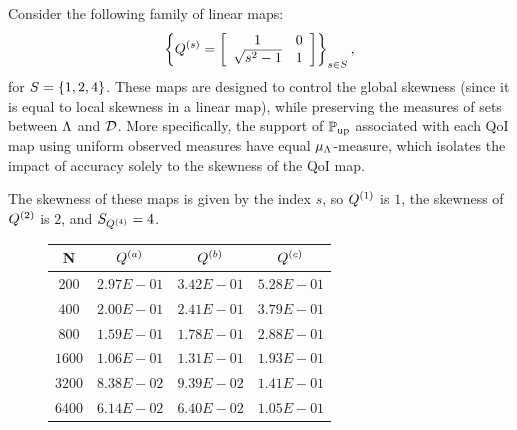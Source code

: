 \begin{ex}
\label{ex:skewness}
Consider the following family of linear maps:
\begin{equation}\label{eq:qmap2}
\left \lbrace \qoi^{(s)} =  \mat{cc}{1 & 0 \\ \sqrt{s^2 - 1}& 1 } \right \rbrace_{s\in S},
\end{equation}
for $S=\set{1,2,4}$. These maps are designed to control the global skewness (since it is equal to local skewness in a linear map), while preserving the measures of sets between $\pspace$ and $\dspace$.
More specifically, the support of $\updatedP$ associated with each QoI map using uniform observed measures have equal $\pmeas$-measure, which isolates the impact of accuracy solely to the skewness of the QoI map.

The skewness of these maps is given by the index $s$, so $\qoi^{(1)}$ is $1$, the skewness of $\qoi^{(2)}$ is $2$, and $S_{\qoi^{(4)}} = 4$.



\begin{figure}[ht]
\begin{minipage}{.65\textwidth}
\begin{table}[H]
\begin{tabular}{ c | c | c | c }
N & $\qoi^{(a)}$ & $\qoi^{(b)}$ & $\qoi^{(c)}$\\ \hline \hline
$200$ & $2.97E-01$ & $3.42E-01$ & $5.28E-01$\\ \hline

$400$ & $2.00E-01$ & $2.41E-01$ & $3.79E-01$\\ \hline

$800$ & $1.59E-01$ & $1.78E-01$ & $2.88E-01$\\ \hline

$1600$ & $1.06E-01$ & $1.31E-01$ & $1.93E-01$\\ \hline

$3200$ & $8.38E-02$ & $9.39E-02$ & $1.41E-01$\\ \hline

$6400$ & $6.14E-02$ & $6.40E-02$ & $1.05E-01$\\ \hline

\end{tabular}
\end{table}


\end{minipage}
\end{figure}
\end{ex}
